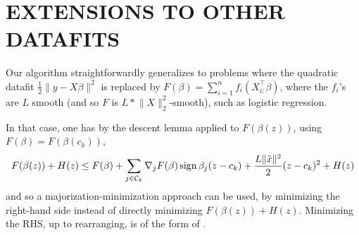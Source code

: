 \section{EXTENSIONS TO OTHER DATAFITS}
\label{sec:other-datafits}

Our algorithm straightforwardly generalizes to problems where the quadratic datafit $\frac{1}{2} \lVert y - X \beta \rVert^2$ is replaced by $F(\beta) = \sum_{i = 1}^n f_i (X_{i:}^\top \beta)$, where the $f_i$'s are $L$ smooth (and so $F$ is $L * \lVert X \rVert_2^2$-smooth), such as logistic regression.

In that case, one has by the descent lemma applied to $F(\beta(z))$, using $F(\beta) = F(\beta(c_k))$,
\begin{equation}
  F(\beta(z)) + H(z) \leq F(\beta) + \sum_{j \in \mathcal{C}_k} \nabla_j F(\beta) \operatorname{sign} \beta_j (z - c_k) + \frac{L \lVert \tilde x \rVert^2}{2} (z - c_k)^2 + H(z)
\end{equation}
and so a majorization-minimization approach can be used, by minimizing the right-hand side instead of directly minimizing $F(\beta(z)) + H(z)$.
Minimizing the RHS, up to rearranging, is of the form of .
